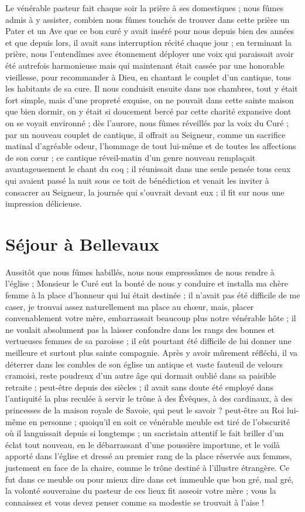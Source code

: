 \documentclass[11pt,a4paper]{report}
\begin{document}
Le vénérable pasteur fait chaque soir la prière à ses domestiques ; nous fûmes admis à y assister, combien nous fûmes touchés de trouver dans cette prière un Pater et un Ave que ce bon curé y avait inséré pour nous depuis bien des années et que depuis lors, il avait sans interruption récité chaque jour ; en terminant la prière, nous l'entendîmes avec étonnement déployer une voix qui paraissait avoir été autrefois harmonieuse mais qui maintenant était cassée par une honorable vieillesse, pour recommander à Dieu, en chantant le couplet d'un cantique, tous les habitants de sa cure. Il nous conduisit ensuite dans nos chambres, tout y était fort simple, mais d'une propreté exquise, on ne pouvait dans cette sainte maison que bien dormir, on y était si doucement bercé par cette charité expansive dont on se voyait environné ; dès l'aurore, nous fûmes réveillés par la voix du Curé ; par un nouveau couplet de cantique, il offrait au Seigneur, comme un sacrifice matinal d'agréable odeur, l'hommage de tout lui-même et de toutes les affections de son cœur ; ce cantique réveil-matin d'un genre nouveau remplaçait avantageusement le chant du coq ; il réunissait dans une seule pensée tous ceux qui avaient passé la nuit sous ce toit de bénédiction et venait les inviter à consacrer au Seigneur, la journée qui s'ouvrait devant eux ; il fit sur nous une impression délicieuse.

\section*{Séjour à Bellevaux}

Aussitôt que nous fûmes habillés, nous nous empressâmes de nous rendre à l'église ; Monsieur le Curé eut la bonté de nous y conduire et installa ma chère femme à la place d'honneur qui lui était destinée ; il n'avait pas été difficile de me caser, je trouvai assez naturellement ma place au chœur, mais, placer convenablement votre mère, embarrassait beaucoup plus notre vénérable hôte ; il ne voulait absolument pas la laisser confondre dans les rangs des bonnes et vertueuses femmes de sa paroisse ; il eût pourtant été difficile de lui donner une meilleure et surtout plus sainte compagnie. Après y avoir mûrement réfléchi, il va déterrer dans les combles de son église un antique et vaste fauteuil de velours cramoisi, reste poudreux d'un autre âge qui dormait oublié dans sa paisible retraite ; peut-être depuis des siècles ; il avait sans doute été employé dans l'antiquité la plus reculée à servir le trône à des Évêques, à des cardinaux, à des princesses de la maison royale de Savoie, qui peut le savoir ? peut-être au Roi lui-même en personne ; quoiqu'il en soit ce vénérable meuble est tiré de l'obscurité où il languissait depuis si longtemps ; un sacristain attentif le fait briller d'un éclat tout nouveau, en le débarrassant d'une poussière importune, et le voilà apporté dans l'église et dressé au premier rang de la place réservée aux femmes, justement en face de la chaire, comme le trône destiné à l'illustre étrangère. Ce fut dans ce meuble ou pour mieux dire dans cet immeuble que bon gré, mal gré, la volonté souveraine du pasteur de ces lieux fit asseoir votre mère ; vous la connaissez et vous devez penser comme sa modestie se trouvait à l'aise !
\end{document}
